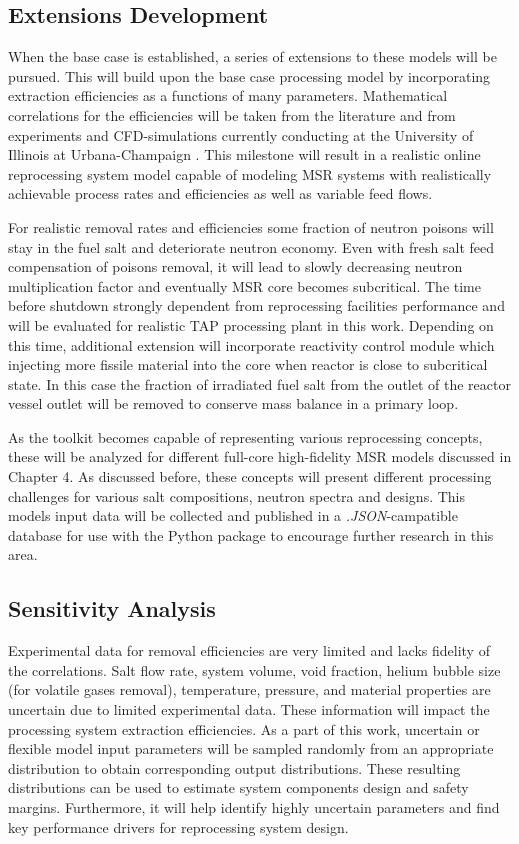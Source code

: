 \subsection{Extensions Development}
When the base case is established, a series of extensions 
to these models will be pursued.
This will build upon the base case processing model by 
incorporating extraction efficiencies as a functions of 
many parameters. Mathematical correlations for the efficiencies 
will be taken from the literature \cite{gabbard_development_1974} 
and from experiments and CFD-simulations currently conducting at 
the University of Illinois at Urbana-Champaign \cite{huff_enabling_2018}.
This milestone will result in a realistic online reprocessing system 
model capable of modeling \gls{MSR} systems with realistically achievable 
process rates and efficiencies as well as variable feed flows. 

For realistic removal rates and efficiencies some fraction of neutron 
poisons will stay in the fuel salt and deteriorate neutron economy. 
Even with fresh salt feed compensation of poisons removal, 
it will lead to slowly decreasing neutron multiplication factor and 
eventually \gls{MSR} core becomes subcritical. The time before 
shutdown strongly dependent from reprocessing facilities performance 
and will be evaluated for realistic \gls{TAP} processing plant in this 
work. Depending on this time, additional extension will incorporate 
reactivity control module which injecting more fissile material 
into the core when reactor is close to subcritical state. In this 
case the fraction of irradiated fuel salt from the outlet of the 
reactor vessel outlet will be removed to conserve mass balance 
in a primary loop.

As the toolkit becomes capable of representing various reprocessing 
concepts, these will be analyzed for different full-core 
high-fidelity \gls{MSR} models discussed in Chapter 4. As discussed 
before, these concepts will present different processing challenges 
for various salt compositions, neutron spectra and designs. This 
models input data will be collected and 
published in a \textit{.JSON}-campatible database for use with the 
Python package to encourage further research in this area.

\subsection{Sensitivity Analysis}
Experimental data for removal efficiencies are very limited and lacks 
fidelity of the correlations. Salt flow rate, system volume, 
void fraction, helium bubble size (for volatile gases removal), 
temperature, pressure, and material properties are uncertain due to 
limited experimental data. These information will impact the 
processing system extraction efficiencies. As a part of this work, 
uncertain or flexible model input parameters will be sampled randomly 
from an appropriate distribution to obtain corresponding output 
distributions. These resulting distributions can be used to estimate 
system components design and safety margins. Furthermore, it will 
help identify highly uncertain parameters and find key performance 
drivers for reprocessing system design.

